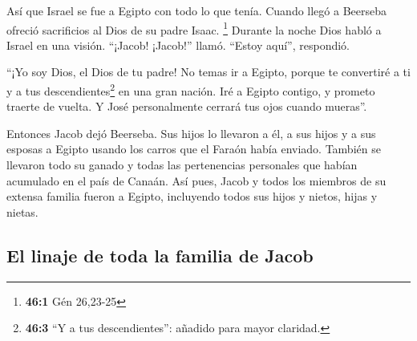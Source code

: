  Así que Israel se fue a Egipto con todo lo que tenía.
Cuando llegó a Beerseba ofreció sacrificios al Dios de su padre Isaac.
\footnote{\textbf{46:1} Gén 26,23-25}  Durante la noche
Dios habló a Israel en una visión. ``¡Jacob! ¡Jacob!'' llamó. ``Estoy
aquí'', respondió.

 ``¡Yo soy Dios, el Dios de tu padre! No temas ir a
Egipto, porque te convertiré a ti y a tus descendientes\footnote{\textbf{46:3}
  ``Y a tus descendientes'': añadido para mayor claridad.} en una gran
nación.  Iré a Egipto contigo, y prometo traerte de
vuelta. Y José personalmente cerrará tus ojos cuando mueras''.

 Entonces Jacob dejó Beerseba. Sus hijos lo llevaron a él,
a sus hijos y a sus esposas a Egipto usando los carros que el Faraón
había enviado.  También se llevaron todo su ganado y todas
las pertenencias personales que habían acumulado en el país de Canaán.
Así pues, Jacob y todos los miembros de su extensa familia fueron a
Egipto,  incluyendo todos sus hijos y nietos, hijas y
nietas.

\hypertarget{el-linaje-de-toda-la-familia-de-jacob}{%
\subsection{El linaje de toda la familia de
Jacob}\label{el-linaje-de-toda-la-familia-de-jacob}}

